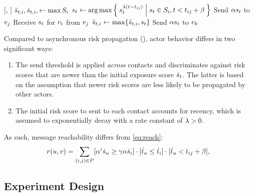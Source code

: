 \begin{function}{\nRiskPropagationActor}[\vGraph, \vScores]
    \State $\tilde{s}_{t, i}, \dot{s}_{t, i}, \leftarrow \max S_i$
      \State $s_t \leftarrow \operatorname{\arg\max} \Set{ s_t^{\lambda(t- t_{ij})} | s_t\in S_i, t< t_{ij} + \beta}$
      \State Send $\alpha s_t$ to $v_j$
    \EndFor
  \EndFor
    \State Receive $s_t$ for $v_i$ from $v_j$
    \State $\tilde{s}_{t, i} \leftarrow \max \{\tilde{s}_{t, i}, s_t\}$
        \State Send $\alpha s_t$ to $v_k$
      \EndIf
    \EndFor
  \EndWhile
\end{function}

Compared to asynchronous risk propagation (), actor behavior differs in two significant ways:
\begin{enumerate}
  \item The send threshold is applied \emph{across} contacts and discriminates against risk scores that are newer than the initial exposure score $\dot{s}_t$. The latter is based on the assumption that newer risk scores are less likely to be propagated by other actors.
  \item The initial risk score to sent to each contact accounts for recency, which is assumed to exponentially decay with a rate constant of $\lambda > 0$.
\end{enumerate}
As such, message reachability differs from \cref{eq:reach}:
\begin{equation}\label{eq:initial-estimated-message-reachability}
  r(u, v) = \sum_{(i, j) \in P} [\alpha^i \dot{s}_u \geq \gamma \alpha \dot{s}_i] \cdot [\dot{t}_u \leq \dot{t}_i] \cdot [\dot{t}_u < t_{ij} + \beta],
\end{equation}

\subsection{Experiment Design}

